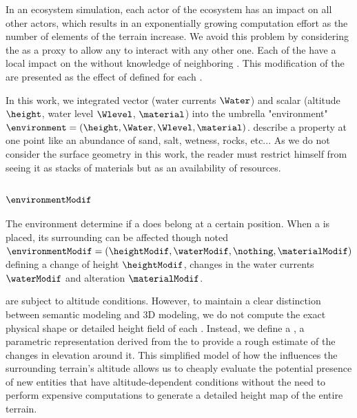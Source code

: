 In an ecosystem simulation, each actor of the ecosystem has an impact on all other actors, which results in an exponentially growing computation effort as the number of elements of the terrain increase. We avoid this problem by considering the  as a proxy to allow any  to interact with any other one. Each of the  have a local impact on the  without knowledge of neighboring . This modification of the  are presented as the effect of  defined for each . %

In this work, we integrated vector  (water currents $\Water$) and scalar  (altitude $\height$, water level $\Wlevel$,  $\material$) into the umbrella "environment" $\environment = \left( \height, \Water, \Wlevel, \material \right)$.  describe a property at one point like an abundance of sand, salt, wetness, rocks, etc... As we do not consider the surface geometry in this work, the reader must restrict himself from seeing it as stacks of materials but as an availability of resources.

\subsubsection{ $\environmentModif$}
The environment determine if a  does belong at a certain position. When a  is placed, its surrounding  can be affected though  noted $\environmentModif = (\heightModif, \waterModif, \nothing, \materialModif)$ defining a change of height $\heightModif$, changes in the water currents $\waterModif$ and  alteration $\materialModif$. 

 are subject to altitude conditions. However, to maintain a clear distinction between semantic modeling and 3D modeling, we do not compute the exact physical shape or detailed height field of each . Instead, we define a , a parametric representation derived from the  to provide a rough estimate of the changes in elevation around it. This simplified model of how the  influences the surrounding terrain's altitude allows us to cheaply evaluate the potential presence of new entities that have altitude-dependent conditions without the need to perform expensive computations to generate a detailed height map of the entire terrain. 

